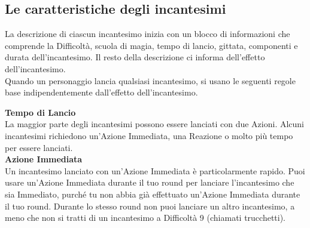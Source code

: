 \begin{multicols}{2}
\subsection{Le caratteristiche degli incantesimi}

La descrizione di ciascun incantesimo inizia con un blocco di informazioni che comprende la Difficoltà, scuola di magia, tempo di lancio, gittata, componenti e durata dell'incantesimo. Il resto della descrizione ci informa dell'effetto dell'incantesimo. \\

Quando un personaggio lancia qualsiasi incantesimo, si usano le seguenti regole base indipendentemente dall'effetto dell'incantesimo.\\

\medskip

\textbf{Tempo di Lancio}\\
La maggior parte degli incantesimi possono essere lanciati con due Azioni. Alcuni incantesimi richiedono un'Azione Immediata, una Reazione o molto più tempo per essere lanciati.\\

\textbf{Azione Immediata}\\
Un incantesimo lanciato con un'Azione Immediata è particolarmente rapido. Puoi usare un'Azione Immediata durante il tuo round per lanciare l'incantesimo che sia Immediato, purché tu non abbia già effettuato un'Azione Immediata durante il tuo round. Durante lo stesso round non puoi lanciare un altro incantesimo, a meno che non si tratti di un incantesimo a Difficoltà 9 (chiamati trucchetti).\\


\end{multicols}
